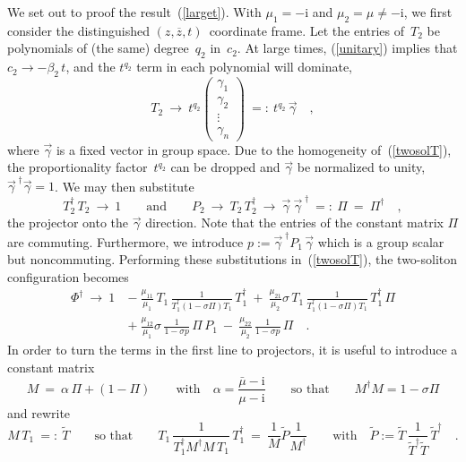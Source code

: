\documentclass[a4paper,11pt]{article}
\numberwithin{equation}{section}
\def\a{\alpha}
\def\b{\beta}
\def\g{\gamma}
\def\s{\sigma}
\def\i{\mbox{i}}
\newcommand{\Tdag}{T^{\dagger}}
\newcommand{\Mdag}{M^{\dagger}}
\newcommand{\zb}{\overline{z}}
\newcommand{\Tt}{\widetilde{T}}
\newcommand{\Pt}{\widetilde{P}}
\begin{document}
\noindent
We set out to proof the result~(\ref{larget}).
With $\mu_1{=}{-}\i$ and $\mu_2{=}\mu{\neq}{-}\i$, we first consider the
distinguished $(z,\zb,t)$~coordinate frame.
Let the entries of~$T_2$ be polynomials of (the same) degree~$q_2$ in~$c_2$.
At large times, (\ref{unitary}) implies that $c_2\to-\b_2\,t$,
and the $t^{q_2}$ term in each polynomial will dominate,
\begin{equation} \label{T2limit}
T_2\ \to\ t^{q_2}
\left(\begin{smallmatrix}
\g_1 \\ \g_2 \\ \vdots \\ \g_n
\end{smallmatrix}\right)
\ =:\ t^{q_2}\,\vec\g \quad,
\end{equation}
where $\vec\g$ is a fixed vector in group space.
Due to the homogeneity of~(\ref{twosolT}),
the proportionality factor~$t^{q_2}$ can be dropped
and $\vec\g$ be normalized to unity, $\vec{\g}^{\;\dagger}\vec{\g}=1$.
We may then substitute
\begin{equation} \label{P2limit}
\Tdag_2\,T_2\ \to\ 1 \qquad\textrm{and}\qquad
P_2\ \to\ T_2\,\Tdag_2\ \to\ \vec{\g}\ \vec{\g}^{\;\dagger}
\ =:\ \Pi \ =\ \Pi^\dagger \quad,
\end{equation}
the projector onto the $\vec\g$ direction.
Note that the entries of the constant matrix $\Pi$ are commuting.
Furthermore, we introduce $p:=\vec{\g}^{\;\dagger}P_1\,\vec{\g}$
which is a group scalar but noncommuting.
Performing these substitutions in~(\ref{twosolT}),
the two-soliton configuration becomes
\begin{align}
\Phi^{\dagger}\ \to\ 1\
&-\ \frac{\mu_{11}}{\mu_1}\,
  T_1\,\frac{1}{\Tdag_1(1{-}\s\Pi)T_1}\,\Tdag_1\
 +\ \frac{\mu_{21}}{\mu_2}\s\,
  T_1\,\frac{1}{\Tdag_1(1{-}\s\Pi)T_1}\,\Tdag_1\,\Pi
\nonumber\\[6pt]
&+\ \frac{\mu_{12}}{\mu_1}\s\,\frac{1}{1{-}\s p}\,\Pi\,P_1\
 -\ \frac{\mu_{22}}{\mu_2}\,\frac{1}{1{-}\s p}\,\Pi \quad.
\end{align}
In order to turn the terms in the first line to projectors,
it is useful to introduce a constant matrix
\begin{equation}
M\ =\ \a\,\Pi + (1{-}\Pi) \qquad\textrm{with}\quad
\a=\frac{\bar{\mu}-\i}{\mu-\i} \qquad\textrm{so that}\qquad
\Mdag M = 1 - \s\Pi
\end{equation}
and rewrite
\begin{equation}
M\,T_1\ =:\ \Tt \qquad\textrm{so that}\qquad
T_1\,\frac{1}{\Tdag_1 \Mdag M\,T_1}\,\Tdag_1\ =\ \frac1M \Pt \frac1{\Mdag}
\qquad\textrm{with}\quad
\Pt := \Tt\,\frac{1}{\Tt^\dagger\Tt}\,\Tt^\dagger \quad.
\end{equation}
\end{document}
